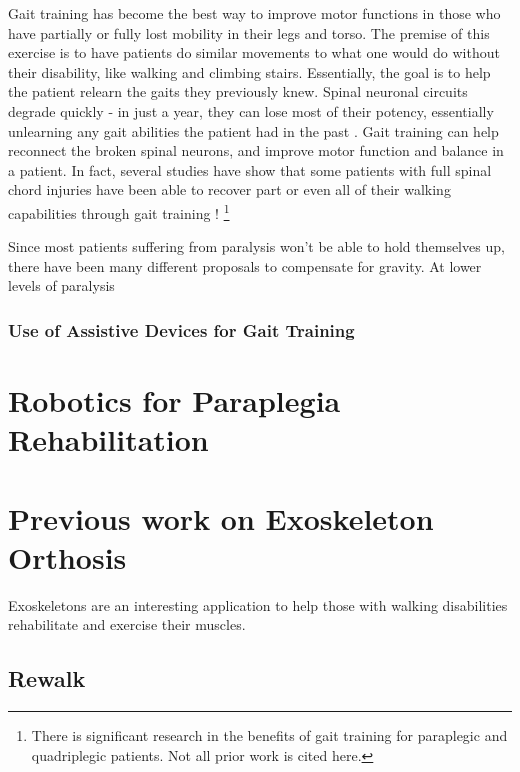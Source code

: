 Gait training has become the best way to improve motor functions in those who have partially or fully lost mobility in their legs and torso. The premise of this exercise is to have patients do similar movements to what one would do without their disability, like walking and climbing stairs. Essentially, the goal is to help the patient relearn the gaits they previously knew. Spinal neuronal circuits degrade quickly - in just a year, they can lose most of their potency, essentially unlearning any gait abilities the patient had in the past \cite{GaitTrainingClinical} \cite{RehabParaplegia} \cite{TrunkMuscleLoadingParaplegia}. Gait training can help reconnect the broken spinal neurons, and improve motor function and balance in a patient. In fact, several studies have show that some patients with full spinal chord injuries have been able to recover part or even all of their walking capabilities through gait training \cite{GaitTrainingClinical} \cite{ImprovingGaitAdaptabilityInPatients}! 
\footnote{There is significant research in the benefits of gait training for paraplegic and quadriplegic patients. Not all prior work is cited here.}

Since most patients suffering from paralysis won't be able to hold themselves up, there have been many different proposals to compensate for gravity. At lower levels of paralysis

\subsubsection{Use of Assistive Devices for Gait Training}


\section{Robotics for Paraplegia Rehabilitation}


\section{Previous work on Exoskeleton Orthosis}
Exoskeletons are an interesting application to help those with walking disabilities rehabilitate and exercise their muscles.

\subsection{Rewalk}

